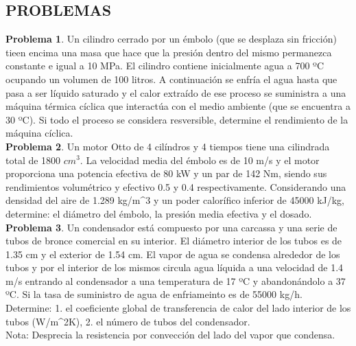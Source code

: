 \documentclass[12pt]{article}
\begin{document}
\subsection{PROBLEMAS}
\textbf{Problema 1}. Un cilindro cerrado por un émbolo (que se desplaza sin fricción) tieen encima una masa que hace que la presión dentro del mismo permanezca constante e igual a 10 MPa. El cilindro contiene inicialmente
agua a 700 ºC ocupando un volumen de 100 litros. A continuación se enfría el agua hasta que pasa a ser líquido saturado y el calor extraído de ese proceso se suministra a una máquina térmica cíclica que interactúa con el medio ambiente (que se encuentra a 30 ºC). Si todo el proceso se considera resversible, determine el rendimiento de la máquina cíclica.
\\
\textbf{Problema 2}. Un motor Otto de 4 cilíndros y 4 tiempos tiene una cilindrada total de 1800 $cm^{3}$. La velocidad media del émbolo es de 10 m/s y el motor proporciona una potencia efectiva de 80 kW y un par de 142 Nm, siendo sus rendimientos volumétrico y efectivo 0.5 y 0.4 respectivamente. Considerando una densidad del aire de 1.289 kg/m^{3} y un poder calorífico inferior de 45000 kJ/kg, determine: el diámetro del émbolo, la presión media efectiva y el dosado.
\\
\textbf{Problema 3}. Un condensador está compuesto por una carcassa y una serie de tubos de bronce comercial en su interior. El diámetro interior de los tubos es de 1.35 cm y el exterior de 1.54 cm. El vapor de agua se condensa alrededor de los tubos y por el interior de los mismos circula agua líquida a una velocidad de 1.4 m/s entrando al condensador a una temperatura de 17 ºC y abandonándolo a 37 ºC. Si la tasa de suministro de agua de enfriameinto es de 55000 kg/h. Determine: 1. el coeficiente global de transferencia de calor del lado interior de los tubos (W/m^{2}K), 2.
el número de tubos del condensador.\\
Nota: Desprecia la resistencia por convección del lado del vapor que condensa.  
\end{document}
